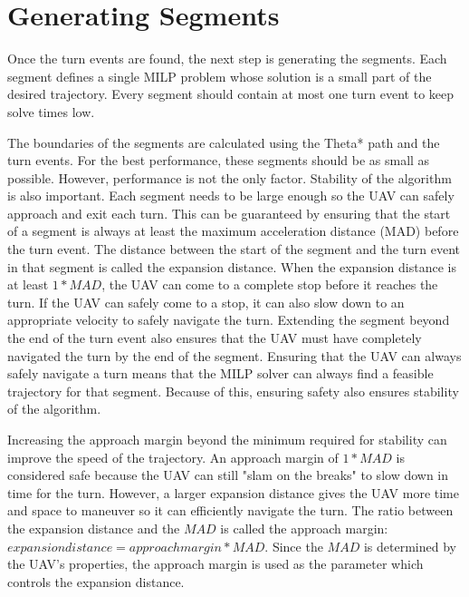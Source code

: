 \section{Generating Segments}

Once the turn events are found, the next step is generating the segments. Each segment defines a single MILP problem whose solution is a small part of the desired trajectory. Every segment should contain at most one turn event to keep solve times low.
\par
The boundaries of the segments are calculated using the Theta* path and the turn events. For the best performance, these segments should be as small as possible. However, performance is not the only factor. Stability of the algorithm is also important. Each segment needs to be large enough so the UAV can safely approach and exit each turn. This can be guaranteed by ensuring that the start of a segment is always at least the maximum acceleration distance (MAD) before the turn event. The distance between the start of the segment and the turn event in that segment is called the expansion distance. When the expansion distance is at least $1*MAD$, the UAV can come to a complete stop before it reaches the turn. If the UAV can safely come to a stop, it can also slow down to an appropriate velocity to safely navigate the turn. Extending the segment beyond the end of the turn event also ensures that the UAV must have completely navigated the turn by the end of the segment. Ensuring that the UAV can always safely navigate a turn means that the MILP solver can always find a feasible trajectory for that segment. Because of this, ensuring  safety also ensures stability of the algorithm. 
\par
Increasing the approach margin beyond the minimum required for stability can improve the speed of the trajectory. An approach margin of $1*MAD$ is considered safe because the UAV can still "slam on the breaks" to slow down in time for the turn. However, a larger expansion distance gives the UAV more time and space to maneuver so it can efficiently navigate the turn. The ratio between the expansion distance and the $MAD$ is called the approach margin: $expansion distance = approach margin * MAD$. Since the $MAD$ is determined by the UAV's properties, the approach margin is used as the parameter which controls the expansion distance.


